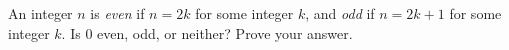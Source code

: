 An integer $n$ is \emph{even} if $n=2k$ for some integer $k$, and \emph{odd} if $n=2k+1$ for some integer $k$. Is $0$ even, odd, or neither? Prove your answer.
